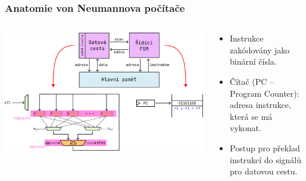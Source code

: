 \documentclass[aspectratio=169,11pt,svgnames,handout]{beamer}
\begin{document}
\begin{frame}

 \frametitle{Anatomie von Neumannova počítače}
 \begin{columns}[T]
  \begin{column}{.6\textwidth}
   \vspace*{-1em}
   \begin{center}
    \includegraphics[width=1.2\textwidth]{anatomy-4.pdf}
   \end{center}
  \end{column}
  \begin{column}{.39\textwidth}
   \begin{itemize}[label=\textbullet]
    \item \alert{Instrukce} zakódovány jako binární čísla.\pause
    \item \alert{Čítač} (PC -- Program Counter): adresa instrukce, která se má
     vykonat.\pause
   \end{itemize}
   \vspace{3em}
   \begin{itemize}[label=\textbullet]
    \item Postup pro překlad instrukcí do signálů pro datovou cestu.
   \end{itemize}
  \end{column}
 \end{columns}
\end{frame}
\end{document}

